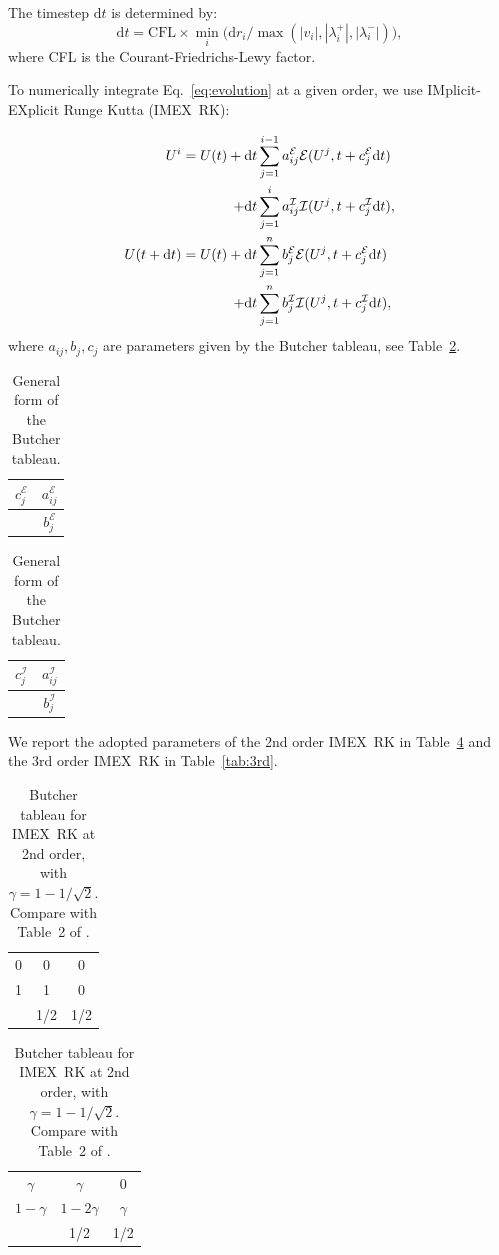 \documentclass[aps,prd,twocolumn,a4paper,floatfix,nofootbib,superscriptaddress,nofootinbib]{revtex4}
\begin{document}
The timestep $\mathrm dt$ is determined by:
\begin{equation}
\label{eq:courant}
\mathrm dt= \mathrm{CFL}\times\min_i\big(\mathrm dr_i/\max(|v_i|,|\lambda^+_i|,|\lambda^-_i|)\big),
\end{equation}
where CFL is the Courant-Friedrichs-Lewy factor.

To numerically integrate Eq.~\eqref{eq:evolution} at a given order, we use 
IMplicit-EXplicit Runge Kutta (IMEX~RK):

\begin{align}
\label{eq:imex1}
U^i=U(t)+{}&\mathrm dt\sum_{j=1}^{i-1} a_{ij}^{\mathcal E} \mathcal E(U^j,t + c_j^{\mathcal E} \mathrm dt) \notag\\
        +{}&\mathrm dt\sum_{j=1}^i a_{ij}^{\mathcal I} \mathcal I(U^j,t + c_j^{\mathcal I} \mathrm dt),\\
\label{eq:imex2}
U(t+\mathrm dt)=U(t)+{}&\mathrm dt\sum_{j=1}^n b_j^{\mathcal E} \mathcal E(U^j,t + c_j^{\mathcal E} \mathrm dt) \notag\\
                    +{}&\mathrm dt\sum_{j=1}^n b_j^{\mathcal I} \mathcal I(U^j,t + c_j^{\mathcal I} \mathrm dt),
\end{align}
where $a_{ij}, b_j, c_j$ are parameters given by the Butcher tableau, see Table~\ref{tab:tableau}.
%
\begin{table}
\caption{General form of the Butcher tableau.}
\begin{tabular}{c|c}
$c^\mathcal{E}_j$ & $a^\mathcal{E}_{ij}$ \\
\hline
& $b^\mathcal{E}_j$
\end{tabular}
\hspace{1cm}
\begin{tabular}{c|c}
$c^\mathcal{I}_j$ & $a^\mathcal{I}_{ij}$ \\
\hline
& $b^\mathcal{I}_j$
\end{tabular}
\label{tab:tableau}
\end{table}
%
We report the adopted parameters of the 2nd order IMEX~RK in Table~\ref{tab:2nd} and the 3rd order IMEX~RK in Table~\ref{tab:3rd}.
%
\begin{table}
\caption{Butcher tableau for IMEX~RK at 2nd order,
with $\gamma= 1 - 1/\sqrt 2$. Compare with Table~2 of \citet{Pareschi10}.}
\begin{tabular}{c|cc}
0 & 0 & 0 \\
1 & 1 & 0 \\
\hline
& 1/2 & 1/2
\end{tabular}
\hspace{1cm}
\begin{tabular}{c|cc}
$\gamma$ & $\gamma$ & 0 \\
$1-\gamma$ & $1-2\gamma$ & $\gamma$ \\
\hline
& 1/2 & 1/2
\end{tabular}
\label{tab:2nd}
\end{table}
\end{document}
